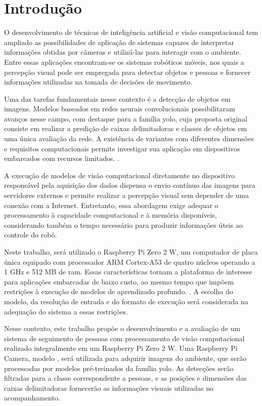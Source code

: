 \chapter{Introdução}
\label{cap:intro}

O desenvolvimento de técnicas de inteligência artificial e visão computacional tem ampliado as possibilidades de aplicação de sistemas capazes de interpretar informações obtidas por câmeras e utilizá-las para interagir com o ambiente. Entre essas aplicações encontram-se os sistemas robóticos móveis, nos quais a percepção visual pode ser empregada para detectar objetos e pessoas e fornecer informações utilizadas na tomada de decisões de movimento.

Uma das tarefas fundamentais nesse contexto é a detecção de objetos em imagens. Modelos baseados em redes neurais convolucionais possibilitaram avanços nesse campo, com destaque para a família \gls{yolo}, cuja proposta original consiste em realizar a predição de caixas delimitadoras e classes de objetos em uma única avaliação da rede. A existência de variantes com diferentes dimensões e requisitos computacionais permite investigar sua aplicação em dispositivos embarcados com recursos limitados. .

A execução de modelos de visão computacional diretamente no dispositivo responsável pela aquisição dos dados dispensa o envio contínuo das imagens para servidores externos e permite realizar a percepção visual sem depender de uma conexão com a Internet. Entretanto, essa abordagem exige adequar o processamento à capacidade computacional e à memória disponíveis, considerando também o tempo necessário para produzir informações úteis ao controle do robô.

Neste trabalho, será utilizado o Raspberry Pi Zero 2 W, um computador de placa única equipado com processador ARM Cortex-A53 de quatro núcleos operando a 1 GHz e 512 MB de \gls{ram}. Essas características tornam a plataforma de interesse para aplicações embarcadas de baixo custo, ao mesmo tempo que impõem restrições à execução de modelos de aprendizado profundo. . A escolha do modelo, da resolução de entrada e do formato de execução será considerada na adequação do sistema a essas restrições.

Nesse contexto, este trabalho propõe o desenvolvimento e a avaliação de um sistema de seguimento de pessoas com processamento de visão computacional realizado integralmente em um Raspberry Pi Zero 2 W. Uma Raspberry Pi Camera, modelo , será utilizada para adquirir imagens do ambiente, que serão processadas por modelos pré-treinados da família \gls{yolo}. As detecções serão filtradas para a classe correspondente a pessoas, e as posições e dimensões das caixas delimitadoras fornecerão as informações visuais utilizadas no acompanhamento.


